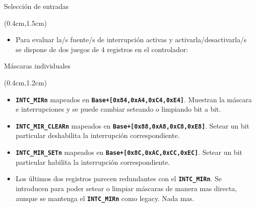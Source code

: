 \documentclass[usenames,table,xcolor={x11names},aspectratio=169]{beamer}
\begin{document}
\begin{frame}[t]{Selección de entradas}
 \begin{textblock*}{\textwidth}(0.4cm,1.5cm)
  \begin{itemize}[<+(1)->]\justifying \parskip 0.2cm
   \item Para evaluar la/s fuente/s de interrupción activas y activarla/desactivarla/s se dispone de dos juegos de 4 registros en el controlador:
  \end{itemize}
 \end{textblock*}
\end{frame}

\begin{frame}[t]{Máscaras individuales}
 \begin{textblock*}{\textwidth}(0.4cm,1.2cm)
  \begin{itemize}[<+(1)->]\justifying \parskip 0.2cm
    \item \texttt{\textbf{INTC\_MIRn}} mapeados en \texttt{\textbf{Base+[0x84,0xA4,0xC4,0xE4]}}. Muestran la máscara e interrupciones y se puede cambiar seteando o limpiando bit a bit.
    \item \texttt{\textbf{INTC\_MIR\_CLEARn}} mapeados en \texttt{\textbf{Base+[0x88,0xA8,0xC8,0xE8]}}. Setear un bit particular deshabilita la interrupción correspondiente.
    \item \texttt{\textbf{INTC\_MIR\_SETn}} mapeados en \texttt{\textbf{Base+[0x8C,0xAC,0xCC,0xEC]}}. Setear un bit particular habilita la interrupción correspondiente.
    \item Los últimos dos registros parecen redundantes con el \texttt{\textbf{INTC\_MIRn}}. Se introducen para poder setear o limpiar máscaras de manera mas directa, aunque se mantenga el \texttt{\textbf{INTC\_MIRn}} como legacy. Nada mas. 
  \end{itemize}
 \end{textblock*}
\end{frame}
  
\end{document}
